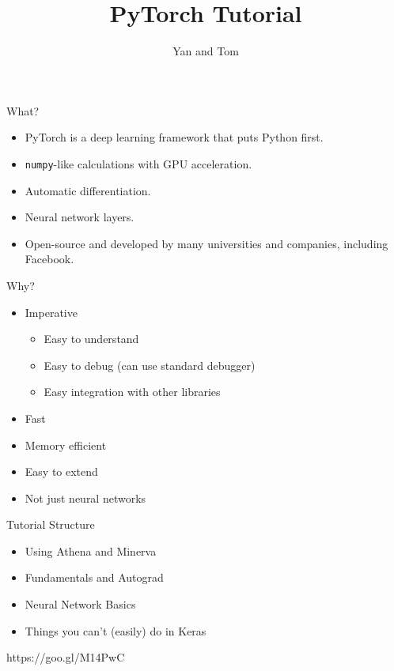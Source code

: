 \documentclass{beamer}
\title{PyTorch Tutorial}
\author{Yan and Tom}
\begin{document}
	\maketitle
	
	\begin{frame}{What?}
	\begin{itemize}
		\item PyTorch is a deep learning framework that puts Python first.
		\item \texttt{numpy}-like calculations with GPU acceleration.
		\item Automatic differentiation.
		\item Neural network layers.
		\item Open-source and developed by many universities and companies, including Facebook.
	\end{itemize}
	\end{frame}

	\begin{frame}{Why?}
	\begin{itemize}
		\item Imperative
			\begin{itemize}
				\item Easy to understand
				\item Easy to debug (can use standard debugger)
				\item Easy integration with other libraries
			\end{itemize}
		\item Fast
		\item Memory efficient
		\item Easy to extend
		\item Not just neural networks
	\end{itemize}
	\end{frame}

	\begin{frame}{Tutorial Structure}
	\begin{itemize}
		\item Using Athena and Minerva
		\item Fundamentals and Autograd
		\item Neural Network Basics
		\item Things you can't (easily) do in Keras 
	\end{itemize}
	https://goo.gl/M14PwC
	\end{frame}
\end{document}

